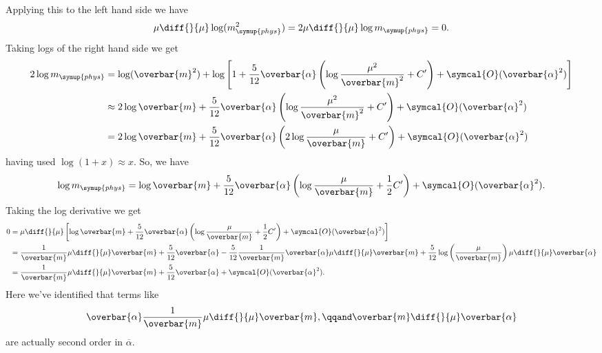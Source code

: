 \documentclass[fleqn]{NotesClass}
\newcommand{\order}{\symcal{O}}
\newcommand{\phys}{\symup{phys}}
\begin{document}
    Applying this to the left hand side we have
    \begin{equation}
        \mu \diff{}{\mu} \log (m_{\phys}^2) = 2\mu \diff{}{\mu} \log m_{\phys} = 0.
    \end{equation}
    Taking logs of the right hand side we get
    \begin{align}
        2\log m_{\phys} &= \log(\overbar{m}^2) + \log\left[ 1 + \frac{5}{12}\overbar{\alpha}\left( \log\frac{\mu^2}{\overbar{m}^2} + C' \right) + \order(\overbar{\alpha}^2) \right]\\
        &\approx 2 \log \overbar{m} + \frac{5}{12}\overbar{\alpha}\left( \log\frac{\mu^2}{\overbar{m}^2} + C' \right) + \order(\overbar{\alpha}^2)\\
        &= 2 \log\overbar{m} + \frac{5}{12}\overbar{\alpha}\left( 2\log\frac{\mu}{\overbar{m}} + C' \right) + \order(\overbar{\alpha}^2)
    \end{align}
    having used \(\log(1 + x) \approx x\).
    So, we have
    \begin{equation}
        \log m_{\phys} = \log\overbar{m} + \frac{5}{12}\overbar{\alpha}\left( \log\frac{\mu}{\overbar{m}} + \frac{1}{2} C' \right) + \order(\overbar{\alpha}^2).
    \end{equation}
    Taking the log derivative we get
    \begin{align}
        0 &= \mu \diff{}{\mu}\left[ \log\overbar{m} + \frac{5}{12}\overbar{\alpha}\left( \log\frac{\mu}{\overbar{m}} + \frac{1}{2} C' \right) + \order(\overbar{\alpha}^2) \right]\\
        &= \frac{1}{\overbar{m}}\mu \diff{}{\mu} \overbar{m} + \frac{5}{12}\overbar{\alpha} - \frac{5}{12}\frac{1}{\overbar{m}} \overbar{\alpha} \mu \diff{}{\mu} \overbar{m} + \frac{5}{12} \log\left( \frac{\mu}{\overbar{m}} \right) \mu \diff{}{\mu} \overbar{\alpha}\\
        &= \frac{1}{\overbar{m}} \mu \diff{}{\mu} \overbar{m} + \frac{5}{12}\overbar{\alpha} + \order(\overbar{\alpha}^2).
    \end{align}
    Here we've identified that terms like
    \begin{equation}
        \overbar{\alpha}\frac{1}{\overbar{m}} \mu \diff{}{\mu} \overbar{m}, \qqand \overbar{m} \diff{}{\mu}\overbar{\alpha}
    \end{equation}
    are actually second order in \(\overbar{\alpha}\).
    
\end{document}
